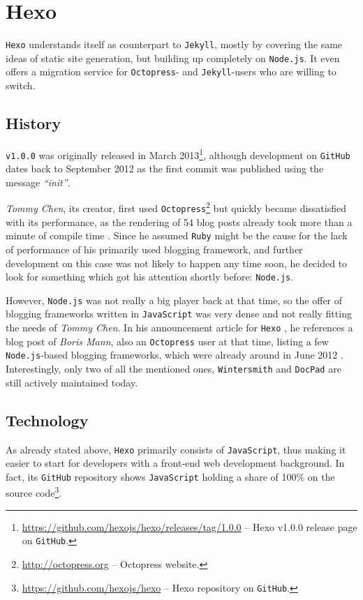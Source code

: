 \section{Hexo}
\label{sec:hexo}

\texttt{Hexo} understands itself as counterpart to \texttt{Jekyll}, mostly by covering the same ideas of static site generation, but building up completely on \texttt{Node.js}. It even offers a migration service for \texttt{Octopress}- and \texttt{Jekyll}-users who are willing to switch.

\subsection{History}
\label{sec:hexo-history}
\texttt{v1.0.0} was originally released in March 2013\footnote{\url{https://github.com/hexojs/hexo/releases/tag/1.0.0} -- Hexo v1.0.0 release page on \texttt{GitHub}.}, although development on \texttt{GitHub} dates back to September 2012 as the first commit was published using the message \emph{``init''}.

\emph{Tommy Chen}, its creator, first used \texttt{Octopress}\footnote{\url{http://octopress.org} -- Octopress website.} but quickly became dissatisfied with its performance, as the rendering of 54 blog posts already took more than a minute of compile time \cite{Chen2012hexodebut}. Since he assumed \texttt{Ruby} might be the cause for the lack of performance of his primarily used blogging framework, and further development on this case was not likely to happen any time soon, he decided to look for something which got his attention shortly before: \texttt{Node.js}.

However, \texttt{Node.js} was not really a big player back at that time, so the offer of blogging frameworks written in \texttt{JavaScript} was very dense and not really fitting the needs of \emph{Tommy Chen}. In his announcement article for \texttt{Hexo} \cite{Chen2012hexodebut}, he references a blog post of \emph{Boris Mann}, also an \texttt{Octopress} user at that time, listing a few \texttt{Node.js}-based blogging frameworks, which were already around in June 2012 \cite{Mann2012nodestaticsite}. Interestingly, only two of all the mentioned ones, \texttt{Wintersmith} and \texttt{DocPad} are still actively maintained today.

\subsection{Technology}
\label{sec:hexo-technology}
As already stated above, \texttt{Hexo} primarily consists of \texttt{JavaScript}, thus making it easier to start for developers with a front-end web development background. In fact, its \texttt{GitHub} repository shows \texttt{JavaScript} holding a share of 100\% on the source code\footnote{\url{https://github.com/hexojs/hexo} -- Hexo repository on \texttt{GitHub}.}.


